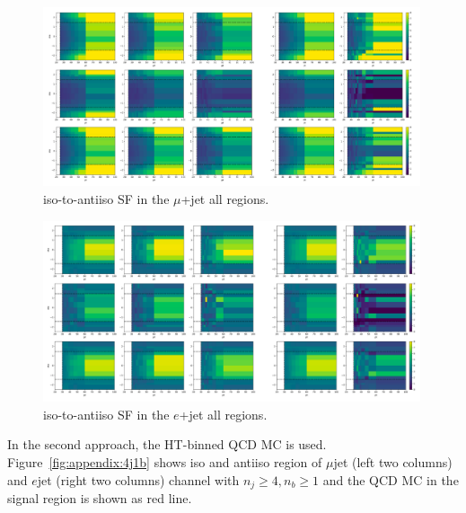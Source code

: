 \begin{figure}
    \centering
    \includegraphics[width=0.99\textwidth]{chapters/Analysis/sectionBackground/figures/ljets_kinematics/sf_mu4j.png}
    \caption{iso-to-antiiso SF in the $\mu$+jet all regions.}
    \label{fig:appendix:allsf}
\end{figure}

\begin{figure}
    \centering
    \includegraphics[width=0.99\textwidth]{chapters/Analysis/sectionBackground/figures/ljets_kinematics/sf_e4j.png}
    \caption{iso-to-antiiso SF in the $e$+jet all regions.}
    \label{fig:appendix:allsf}
\end{figure}




In the second approach, the HT-binned QCD MC is used. Figure~\ref{fig:appendix:4j1b} shows iso and antiiso region of $\mu$jet (left two columns) and $e$jet (right two columns) channel
with $n_j\geq4,n_b\geq1$ and the QCD MC in the signal region is shown as red line.

